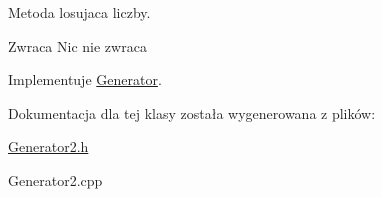 Metoda losujaca liczby. 

\begin{DoxyReturn}{Zwraca}
Nic nie zwraca 
\end{DoxyReturn}


Implementuje \hyperlink{classGenerator_ace6b7b9d7b8afcf8a980277dee90d04b}{Generator}.



Dokumentacja dla tej klasy została wygenerowana z plików\+:\begin{DoxyCompactItemize}
\item 
\hyperlink{Generator2_8h}{Generator2.\+h}\item 
Generator2.\+cpp\end{DoxyCompactItemize}
